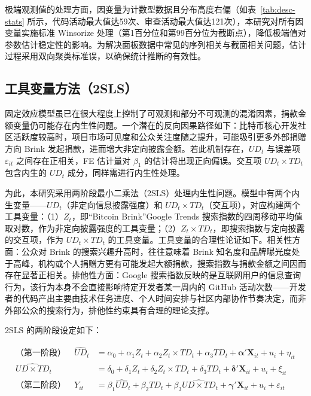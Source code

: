 极端观测值的处理方面，因变量为计数型数据且分布高度右偏（如表~\ref{tab:desc-stats} 所示，代码活动最大值达59次、审查活动最大值达121次），本研究对所有因变量实施标准 Winsorize 处理（第1百分位和第99百分位为截断点），降低极端值对参数估计稳定性的影响。为解决面板数据中常见的序列相关与截面相关问题，估计过程采用双向聚类标准误，以确保统计推断的有效性。

\subsection{工具变量方法（2SLS）}
\label{sec:iv-method}

固定效应模型虽已在很大程度上控制了可观测和部分不可观测的混淆因素，捐款金额变量仍可能存在内生性问题。一个潜在的反向因果路径如下：比特币核心开发社区活跃度较高时，项目市场可见度和公众关注度随之提升，可能吸引更多外部捐赠方向 Brink 发起捐款，进而增大非定向披露金额。若此机制存在，$UD_t$ 与误差项 $\varepsilon_{it}$ 之间存在正相关，FE 估计量对 $\beta_1$ 的估计将出现正向偏误。交互项 $UD_t \times TD_t$ 包含内生的 $UD_t$ 成分，同样需进行内生性处理。

为此，本研究采用两阶段最小二乘法（2SLS）处理内生性问题。模型中有两个内生变量——$UD_t$（非定向信息披露强度）和 $UD_t \times TD_t$（交互项），对应构建两个工具变量：（1）$Z_t$，即“Bitcoin Brink”Google Trends 搜索指数的四周移动平均值取对数，作为非定向披露强度的工具变量；（2）$Z_t \times TD_t$，即搜索指数与定向披露的交互项，作为 $UD_t \times TD_t$ 的工具变量。工具变量的合理性论证如下。相关性方面：公众对 Brink 的搜索兴趣升高时，往往意味着 Brink 知名度和品牌曝光度处于高峰，机构或个人捐赠方更有可能发起大额捐款，搜索指数与捐款金额之间因而存在显著正相关。排他性方面：Google 搜索指数反映的是互联网用户的信息查询行为，该行为本身不会直接影响特定开发者某一周内的 GitHub 活动次数——开发者的代码产出主要由技术任务进度、个人时间安排与社区内部协作节奏决定，而非外部公众的搜索行为，排他性约束具有合理的理论支撑。

2SLS 的两阶段设定如下：

\begin{align}
\text{（第一阶段）}\quad
    \widehat{UD}_t
        &= \alpha_0 + \alpha_1 Z_t
           + \alpha_2 Z_t \times TD_t
           + \alpha_3 TD_t
           + \boldsymbol{\alpha}' \mathbf{X}_{it} + u_i + \eta_{it}
\label{eq:first-stage} \\[0.5em]
    \widehat{UD \times TD}_t
        &= \delta_0 + \delta_1 Z_t
           + \delta_2 Z_t \times TD_t
           + \delta_3 TD_t
           + \boldsymbol{\delta}' \mathbf{X}_{it} + u_i + \xi_{it}
\label{eq:first-stage-2} \\[0.5em]
\text{（第二阶段）}\quad
    Y_{it}
        &= \beta_1 \widehat{UD}_t
           + \beta_2 TD_t
           + \beta_3 \widehat{UD \times TD}_t
           + \boldsymbol{\gamma}' \mathbf{X}_{it}
           + u_i + \varepsilon_{it}
\label{eq:second-stage}
\end{align}

